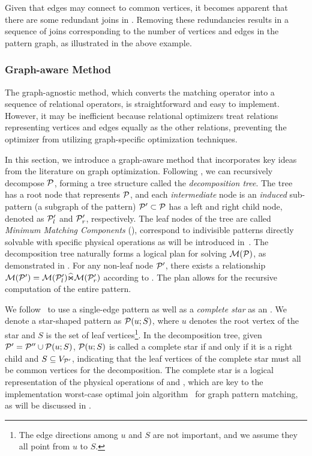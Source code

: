 Given that edges may connect to common vertices, it becomes apparent that there are some redundant joins in . Removing these redundancies results in a sequence of joins corresponding to the number of vertices and edges in the pattern graph, as illustrated in the above example.

\subsubsection{Graph-aware Method}
\label{sec:graph-aware}
The graph-agnostic method, which converts the matching operator into a sequence of relational operators, is straightforward and easy to implement. However, it may be inefficient because relational optimizers treat relations representing vertices and edges equally as the other relations, preventing the optimizer from utilizing graph-specific optimization techniques. %

In this section, we introduce a graph-aware method that incorporates key ideas from the literature on graph optimization. Following , we can recursively decompose $\mathcal{P}$, forming a tree structure called the \emph{decomposition tree}. The tree has a root node that represents $\mathcal{P}$, and each \emph{intermediate} node is an \emph{induced} sub-pattern (a subgraph of the pattern) $\mathcal{P}' \subset \mathcal{P}$ has a left and right child node, denoted as $\mathcal{P}'_l$ and $\mathcal{P}'_r$, respectively. %
The leaf nodes of the tree are called \emph{Minimum Matching Components} (\mmc), correspond to indivisible patterns directly solvable with specific physical operations
as will be introduced in~. The decomposition tree naturally forms a logical plan for solving $\mathcal{M}(\mathcal{P})$, as demonstrated in . For any non-leaf node $\mathcal{P}'$, there exists a relationship $\mathcal{M}(\mathcal{P}') = \mathcal{M}(\mathcal{P}'_l) \widehat{\Join} \mathcal{M}(\mathcal{P}'_r)$ according to . The plan allows for the recursive computation of the entire pattern.

We follow~\cite{huge} to use a single-edge pattern as well as a \emph{complete star} as an \mmc. We denote a star-shaped pattern as $\mathcal{P}(u;S)$, where $u$ denotes the root vertex of the star and $S$ is the set of leaf vertices\footnote{The edge directions among $u$ and $S$ are not important, and we assume they  all point from $u$ to $S$.}.
In the decomposition tree, given $\mathcal{P}' = \mathcal{P}'' \cup \mathcal{P}(u;S)$, $\mathcal{P}(u;S)$ is called a complete star if and only if it is a right child and $S \subseteq V_{\mathcal{P}'}$, indicating that the leaf vertices of the complete star must all be common vertices for the decomposition. The complete star is a logical representation of the physical operations of \expand and \intersection, which are key to the implementation worst-case optimal join algorithm~\cite{mhedhbi2019optimizing} for graph pattern matching, as will be discussed in .

